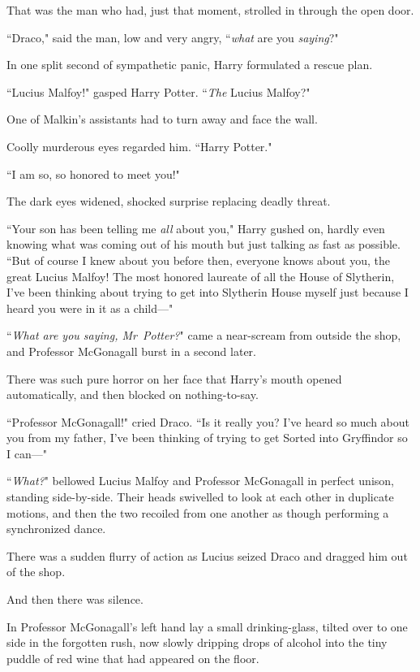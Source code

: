 That was the man who had, just that moment, strolled in through the open door.

``Draco," said the man, low and very angry, ``\emph{what} are you \emph{saying}?"

In one split second of sympathetic panic, Harry formulated a rescue plan.

``Lucius Malfoy!" gasped Harry Potter. ``\emph{The} Lucius Malfoy?"

One of Malkin's assistants had to turn away and face the wall.

Coolly murderous eyes regarded him. ``Harry Potter."

``I am so, so honored to meet you!"

The dark eyes widened, shocked surprise replacing deadly threat.

``Your son has been telling me \emph{all} about you," Harry gushed on, hardly even knowing what was coming out of his mouth but just talking as fast as possible. ``But of course I knew about you before then, everyone knows about you, the great Lucius Malfoy! The most honored laureate of all the House of Slytherin, I've been thinking about trying to get into Slytherin House myself just because I heard you were in it as a child—"

``\emph{What are you saying, Mr~Potter?}" came a near-scream from outside the shop, and Professor McGonagall burst in a second later.

There was such pure horror on her face that Harry's mouth opened automatically, and then blocked on nothing-to-say.

``Professor McGonagall!" cried Draco. ``Is it really you? I've heard so much about you from my father, I've been thinking of trying to get Sorted into Gryffindor so I can—"

``\emph{What?}" bellowed Lucius Malfoy and Professor McGonagall in perfect unison, standing side-by-side. Their heads swivelled to look at each other in duplicate motions, and then the two recoiled from one another as though performing a synchronized dance.

There was a sudden flurry of action as Lucius seized Draco and dragged him out of the shop.

And then there was silence.

In Professor McGonagall's left hand lay a small drinking-glass, tilted over to one side in the forgotten rush, now slowly dripping drops of alcohol into the tiny puddle of red wine that had appeared on the floor.

